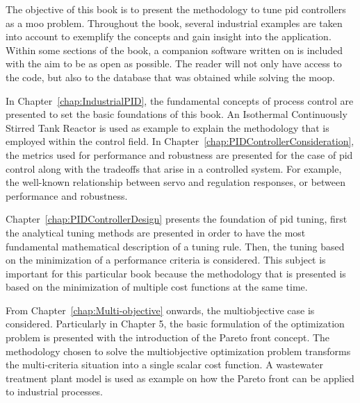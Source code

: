 The objective of this book is to present the methodology to tune \gls{pid} controllers as a \gls{moo} problem. Throughout the book, several industrial examples are taken into account to exemplify the concepts and gain insight into the application. Within some sections of the book, a companion software written on \matlab is included with the aim to be as open as possible. The reader will not only have access to the code, but also to the database that was obtained while solving the \gls{moop}.

In Chapter~\ref{chap:IndustrialPID}, the fundamental concepts of process control are presented to set the basic foundations of this book. An Isothermal Continuously Stirred Tank Reactor is used as example to explain the methodology that is employed within the control field. In Chapter~\ref{chap:PIDControllerConsideration}, the metrics used for performance and robustness are presented for the case of \gls{pid} control along with the tradeoffs that arise in a controlled system. For example, the well-known relationship between servo and regulation responses, or between performance and robustness.

Chapter~\ref{chap:PIDControllerDesign} presents the foundation of \gls{pid} tuning, first the analytical tuning methods are presented in order to have the most fundamental mathematical description of a tuning rule. Then, the tuning based on the minimization of a performance criteria is considered. This subject is important for this particular book because the methodology that is presented is based on the minimization of multiple cost functions at the same time.

From Chapter~\ref{chap:Multi-objective} onwards, the multiobjective case is considered. Particularly in Chapter 5, the basic formulation of the optimization problem is presented with the introduction of the Pareto front concept. The methodology chosen to solve the multiobjective optimization problem transforms the multi-criteria situation into a single scalar cost function. A wastewater treatment plant model is used as example on how the Pareto front can be applied to industrial processes.

